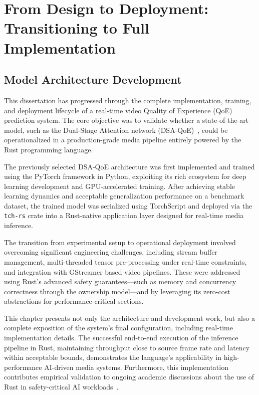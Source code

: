 \chapter{From Design to Deployment: Transitioning to Full Implementation} \label{chap:ch3}

\section{Model Architecture Development}

This dissertation has progressed through the complete implementation, training, and deployment lifecycle of a real-time video Quality of Experience (QoE) prediction system. The core objective was to validate whether a state-of-the-art model, such as the Dual-Stage Attention network (DSA-QoE)~\cite{jia2024continuous}, could be operationalized in a production-grade media pipeline entirely powered by the Rust programming language.

The previously selected DSA-QoE architecture was first implemented and trained using the PyTorch framework in Python, exploiting its rich ecosystem for deep learning development and GPU-accelerated training. After achieving stable learning dynamics and acceptable generalization performance on a benchmark dataset, the trained model was serialized using TorchScript and deployed via the \texttt{tch-rs} crate into a Rust-native application layer designed for real-time media inference.

The transition from experimental setup to operational deployment involved overcoming significant engineering challenges, including stream buffer management, multi-threaded tensor pre-processing under real-time constraints, and integration with GStreamer based video pipelines. These were addressed using Rust's advanced safety guarantees—such as memory and concurrency correctness through the ownership model—and by leveraging its zero-cost abstractions for performance-critical sections.

This chapter presents not only the architecture and development work, but also a complete exposition of the system's final configuration, including real-time implementation details. The successful end-to-end execution of the inference pipeline in Rust, maintaining throughput close to source frame rate and latency within acceptable bounds, demonstrates the language's applicability in high-performance AI-driven media systems. Furthermore, this implementation contributes empirical validation to ongoing academic discussions about the use of Rust in safety-critical AI workloads~\cite{fulton2022benefits, johansson2023transitioning, carnelos2025microflow}.

